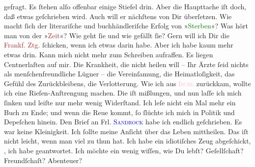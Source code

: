                gefragt. Es ſtehen alſo offenbar einige Stiefel drin. Aber die Haupttache iſt doch,
               daß etwas geſchrieben wird. Auch will er nächſtens \label{K_L02630-4v}\label{K_L02630-4h} von Dir überſetzen. Wie macht ſich der literariſche und
               buchhändleriſche Erfolg von »\textcolor{green}{Sterben}{}\ledrightnote{\textcolor{green}{Sterben. Novelle}}«?\pend
           \pstart
           Was hört man von der »\textcolor{brown}{Zeit}{}\ledrightnote{\textcolor{brown}{Die Zeit. Wiener Wochenschrift}}«? Wie geht ſie und wie
               gefällt ſie?\pend
           \pstart
           Gern will ich Dir die \textcolor{brown}{Frankf. Ztg.}{}\ledrightnote{\textcolor{brown}{Frankfurter Zeitung}} ſchicken, wenn
               ich etwas darin habe. Aber ich habe kaum mehr etwas drin. Kann {\pb}mich nicht mehr zum Schreiben aufraffen. Es liegen
               Centnerlaſten auf mir. Die Krankheit, die nicht heilen will – Ihr Ärzte ſeid nichts
               als menſchenfreundliche Lügner – die Vereinſamung, die Heimatloſigkeit, das Gefühl
               des Zurückbleibens, die Verlotterung. Wie ich aus \textsc{\textcolor{pink}{Ischl}{}\ledrightnote{\textcolor{pink}{Bad Ischl}}} zurückkam, wollte ich eine Rieſen-Anſtrengung
               machen. Die iſt mißlungen, und nun laſſe ich mich ſinken und leiſte nur mehr wenig
               Widerſtand. Ich leſe nicht ein Mal mehr ein Buch zu Ende; und wenn die Reue kommt, ſo
               ſlüchte ich mich in Politik und Depeſchen hinein.\pend
           \pstart
           {\pb}Den Brief an Frl. \textsc{\textcolor{blue}{Sandrock}{}\ledrightnote{\textcolor{blue}{Adele Sandrock}}} habe ich endlich geſchrieben. Es
               war keine Kleinigkeit. Ich ſollte meine Anſicht über das Leben mittheilen. Das iſt
               nicht leicht, wenn man viel zu thun hat. Ich habe ein idiotiſches Zeug abgeſchickt,
                  \textsc{\label{K_mets_Goldmann_94-partII-66v}\label{K_mets_Goldmann_94-partII-66h}},
               ich habe geantwortet.\pend
           \pstart
           Ich möchte ein wenig wiſſen, wie Du lebſt? Geſellſchaft? Freundſchaſt? Abenteuer?\pend
           \pstart
